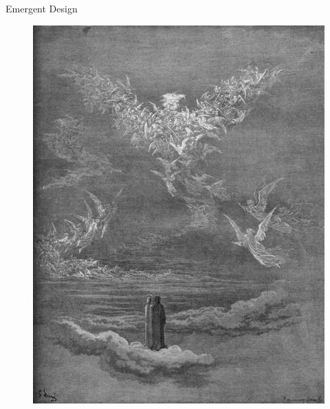\documentclass[12pt,xcolor=x11names]{beamer}
\begin{document}
\begin{frame}{Emergent Design}
    \begin{figure}
        \centering \includegraphics[height=0.75\textheight]{emergentdesign.jpg}
    \end{figure}
\end{frame}
\end{document}
